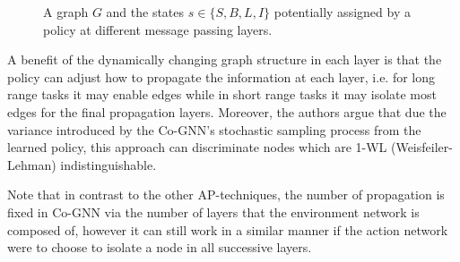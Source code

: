 \documentclass{gdl}
\begin{document}
\begin{figure}[h!]
    \centering
    \captionsetup{justification=centerlast}
    \caption{A graph $G$ and the states $s \in \{S, B, L, I\}$ potentially assigned by a policy at different message passing layers.}
    \label{fig:cognn-actions} 
\end{figure}

A benefit of the dynamically changing graph structure in each layer is that the policy can adjust how to propagate the information at each layer, i.e. for long range tasks it may enable edges while in short range tasks it may isolate most edges for the final propagation layers. Moreover, the authors argue that due the variance introduced by the Co-GNN's stochastic sampling process from the learned policy, this approach can discriminate nodes which are 1-WL (Weisfeiler-Lehman) indistinguishable.

Note that in contrast to the other AP-techniques, the number of propagation is fixed in Co-GNN via the number of layers that the environment network is composed of, however it can still work in a similar manner if the action network were to choose to isolate a node in all successive layers.
\end{document}
